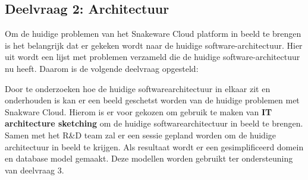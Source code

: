 \subsection{Deelvraag 2: Architectuur}
Om de huidige problemen van het Snakeware Cloud platform in beeld te brengen is het belangrijk dat er gekeken wordt naar de huidige software-architectuur.
Hier uit wordt een lijst met problemen verzameld die de huidige software-architectuur nu heeft.
Daarom is de volgende deelvraag opgesteld:

\begin{center}
	\textit{\SubquestionTwo}
\end{center}

\whitespace[0.2]
Door te onderzoeken hoe de huidige softwarearchitectuur in elkaar zit en onderhouden is kan er een beeld geschetst worden van de huidige problemen met Snakware Cloud.
Hierom is er voor gekozen om gebruik te maken van \textbf{IT architecture sketching} om de huidige softwarearchitectuur in beeld te brengen.
Samen met het R\&D team zal er een sessie gepland worden om de huidige architectuur in beeld te krijgen.
Als resultaat wordt er een gesimplificeerd  domein en database model gemaakt.
Deze modellen worden gebruikt ter ondersteuning van deelvraag 3.
